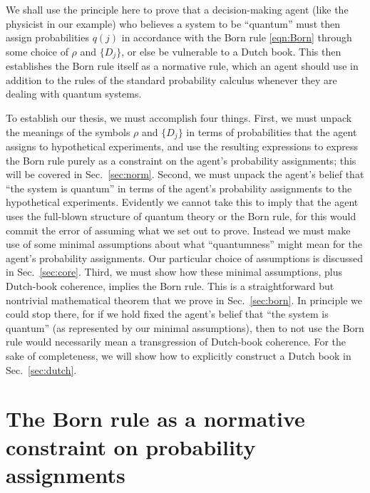 \documentclass[%
 reprint,superscriptaddress,
 amsmath,amssymb,
 aps,pra, onecolumn, 12pt
]{revtex4-2}
\begin{document}
We shall use the principle here to prove that a decision-making agent (like the physicist in our example) who believes a system to be ``quantum'' must then assign probabilities $q(j)$ in accordance with the Born rule \eqref{eqn:Born} through some choice of $\rho$ and $\{ D_j \}$, or else be vulnerable to a Dutch book. This then establishes the Born rule itself as a normative rule, which an agent should use in addition to the rules of the standard probability calculus whenever they are dealing with quantum systems.

To establish our thesis, we must accomplish four things. First, we must unpack the meanings of the symbols $\rho$ and $\{ D_j \}$ in terms of probabilities that the agent assigns to hypothetical experiments, and use the resulting expressions to express the Born rule purely as a constraint on the agent's probability assignments; this will be covered in Sec.\ \ref{sec:norm}\@.
Second, we must unpack the agent's belief that ``the system is quantum'' in terms of the agent's probability assignments to the hypothetical experiments. Evidently we cannot take this to imply that the agent uses the full-blown structure of quantum theory or the Born rule, for this would commit the error of assuming what we set out to prove. Instead we must make use of some minimal assumptions about what ``quantumness'' might mean for the agent's probability assignments. Our particular choice of assumptions is discussed in Sec.\ \ref{sec:core}\@.
Third, we must show how these minimal assumptions, plus Dutch-book coherence, implies the Born rule. This is a straightforward but nontrivial mathematical theorem that we prove in Sec.\ \ref{sec:born}\@. In principle we could stop there, for if we hold fixed the agent's belief that ``the system is quantum'' (as represented by our minimal assumptions), then to not use the Born rule would necessarily mean a transgression of Dutch-book coherence. For the sake of completeness, we will show how to explicitly construct a Dutch book in Sec.\ \ref{sec:dutch}.

\section{The Born rule as a normative constraint on probability assignments \label{sec:norm}}
\end{document}

